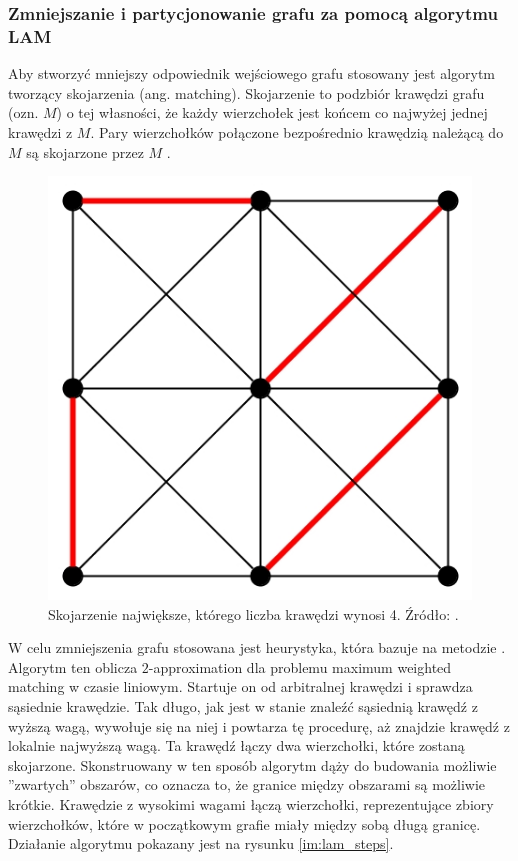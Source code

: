 \subsubsection{Zmniejszanie i partycjonowanie grafu za pomocą algorytmu LAM}

Aby stworzyć mniejszy odpowiednik wejściowego grafu stosowany jest algorytm tworzący skojarzenia (ang. matching).
Skojarzenie to podzbiór krawędzi grafu (ozn. $M$) o tej własności, że każdy wierzchołek jest końcem co najwyżej jednej krawędzi z $M$.
Pary wierzchołków połączone bezpośrednio krawędzią należącą do $M$ są skojarzone przez $M$ \cite{wiki:skojarzenie}.
\begin{figure}[h]
    \centering
    \includegraphics[width=0.24\linewidth]{images/Maximum_matching}
    \caption{Skojarzenie największe, którego liczba krawędzi wynosi 4.
    Źródło: \cite{wiki:skojarzenie}.}
    \label{im:max_skojarzenie}
\end{figure}

W celu zmniejszenia grafu stosowana jest heurystyka, która bazuje na metodzie \cite{weighted_maching}.
Algorytm ten oblicza $2$-approximation dla problemu maximum weighted matching w czasie liniowym.
Startuje on od arbitralnej krawędzi i sprawdza sąsiednie krawędzie.
Tak długo, jak jest w stanie znaleźć sąsiednią
krawędź z wyższą wagą, wywołuje się na niej i powtarza tę procedurę, aż znajdzie krawędź z lokalnie najwyższą wagą.
Ta krawędź łączy dwa wierzchołki, które zostaną skojarzone.
Skonstruowany w ten sposób algorytm dąży do budowania możliwie ''zwartych'' obszarów,
co oznacza to, że granice między obszarami są możliwie krótkie.
Krawędzie z wysokimi wagami łączą wierzchołki,
reprezentujące zbiory wierzchołków, które w początkowym grafie miały między sobą długą granicę.
Działanie algorytmu pokazany jest na rysunku \ref{im:lam_steps}.


